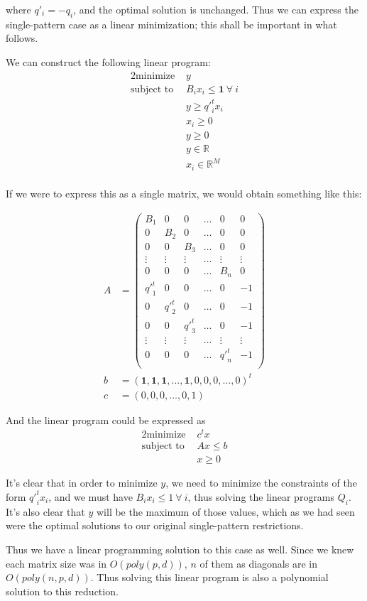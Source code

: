 where $q'_i = -q_i$, and the optimal solution is unchanged. Thus we can express the single-pattern case as a linear minimization; this shall be important in what follows.

We can construct the following linear program:
\begin{alignat*}{2}
  \text{minimize } & y\\
  \text{subject to } & B_i x_i \le \mathbf{1}\ \forall\ i\\
                     & y \ge {q'}_i^t x_i\\
                     & x_i \ge 0\\
                     & y \ge 0\\
                     & y \in \mathbb{R}\\
                     & x_i \in \mathbb{R}^M\\
\end{alignat*}

If we were to express this as a single matrix, we would obtain something like this:

\begin{align*}
A &= \begin{pmatrix}
B_1 & 0   & 0   & \dots & 0 & 0\\
0   & B_2 & 0   & \dots & 0 & 0\\
0   & 0   & B_3 & \dots & 0 & 0\\
\vdots & \vdots & \vdots & \dots & \vdots & \vdots\\
0 & 0 & 0 & \dots & B_n & 0\\
{q'}_1^t & 0 & 0 & \dots & 0 & -1\\
0 & {q'}_2^t & 0 & \dots & 0 & -1\\
0 & 0 & {q'}_3^t & \dots & 0 & -1\\
\vdots & \vdots & \vdots & \dots & \vdots & \vdots\\
0 & 0 & 0 & \dots & {q'}_n^t & -1\\
\end{pmatrix}\\
b &= (\mathbf{1}, \mathbf{1}, \mathbf{1}, \dots, \mathbf{1}, 0, 0, 0, \dots, 0)^t\\
c &= (0, 0, 0, \dots, 0, 1)
\end{align*}

And the linear program could be expressed as
\begin{alignat*}{2}
  \text{minimize } & c^t x\\
  \text{subject to } & Ax \le b\\
                     & x \ge 0
\end{alignat*}


It's clear that in order to minimize $y$, we need to minimize the constraints of the form ${q'}_i^t x_i$, and we must have $B_i x_i \le 1\ \forall\ i$, thus solving the linear programs $Q_i$. It's also clear that $y$ will be the maximum of those values, which as we had seen were the optimal solutions to our original single-pattern restrictions.

Thus we have a linear programming solution to this case as well. Since we knew each matrix size was in $O(poly(p, d))$, $n$ of them as diagonals are in $O(poly(n, p, d))$. Thus solving this linear program is also a polynomial solution to this reduction.
